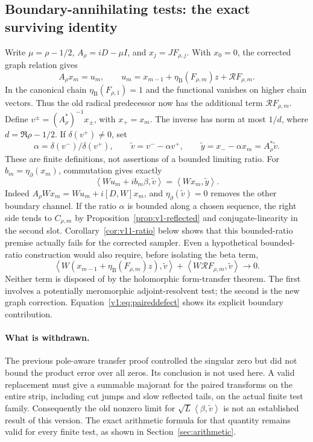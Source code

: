 \documentclass[11pt]{article}
\theoremstyle{remark}
\newcommand{\ip}[2]{\left\langle #1,#2\right\rangle}
\begin{document}
\subsection*{Boundary-annihilating tests: the exact surviving identity}
Write $\mu=\rho-1/2$, $A_\rho=iD-\mu I$, and $x_j=JF_{\rho,j}$.
With $x_0=0$, the corrected graph relation gives
\[
 A_\rho x_m=u_m,\qquad
 u_m=x_{m-1}+\eta_{\mathrm B}(F_{\rho,m})z+\mathcal R F_{\rho,m}.
\]
In the canonical chain $\eta_{\mathrm B}(F_{\rho,1})=1$ and the
functional vanishes on higher chain vectors. Thus the old radical
predecessor now has the additional term $\mathcal R F_{\rho,m}$.
Define $v^\pm=(A_\rho^*)^{-1}x_\pm$, with $x_+=x_m$.
The inverse has norm at most $1/d$, where $d=\Re\rho-1/2$.
If $\delta(v^+)\ne0$, set
\[
 \alpha=\delta(v^-)/\delta(v^+),\qquad
 \widetilde v=v^- -\alpha v^+,\qquad
 \widetilde y=x_- -\alpha x_m=A_\rho^*\widetilde v.
\]
These are finite definitions, not assertions of a bounded limiting ratio.
For $b_m=\eta_\partial(x_m)$, commutation gives exactly
\begin{equation}\label{eq:v1-boundarytest}
 \ip{Wu_m+ib_m\beta}{\widetilde v}
       =\ip{Wx_m}{\widetilde y}.
\end{equation}
Indeed $A_\rho Wx_m=Wu_m+i[D,W]x_m$, and
$\eta_\partial(\widetilde v)=0$ removes the other boundary channel.
If the ratio $\alpha$ is bounded along a chosen sequence, the right side
tends to $C_{\rho,m}$ by Proposition~\ref{prop:v1-reflected} and
conjugate-linearity in the second slot. Corollary~\ref{cor:v11-ratio}
below shows that this bounded-ratio premise actually fails for the
corrected sampler. Even a hypothetical bounded-ratio construction would
also require, before isolating the beta term,
\begin{equation}\label{eq:v1-needed-pole-transfer}
 \ip{W(x_{m-1}+\eta_{\mathrm B}(F_{\rho,m})z)}{\widetilde v}
       +\ip{W\mathcal R F_{\rho,m}}{\widetilde v}\longrightarrow0.
\end{equation}
Neither term is disposed of by the holomorphic form-transfer theorem.
The first involves a potentially meromorphic adjoint-resolvent test; the
second is the new graph correction. Equation~\eqref{v1:eq:paireddefect}
shows its explicit boundary contribution.

\paragraph{What is withdrawn.}
The previous pole-aware transfer proof controlled the singular zero but
did not bound the product error over all zeros. Its conclusion is not used
here. A valid replacement must give a summable majorant for the paired
transforms on the entire strip, including cut jumps and slow reflected
tails, on the actual finite test family. Consequently the old nonzero
limit for $\sqrt L\ip{\beta}{\widetilde v}$ is not an established result
of this version. The exact arithmetic formula for that quantity remains
valid for every finite test, as shown in Section~\ref{sec:arithmetic}.
\end{document}
